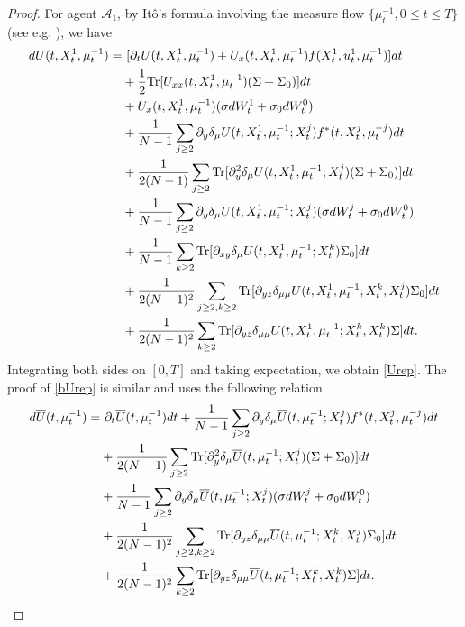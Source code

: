 \documentclass{amsart}
\theoremstyle{definition}
\theoremstyle{remark}
\numberwithin{equation}{section}
\begin{document}
\begin{proof}
For agent ${\mathcal A}_1$, by It\^o's formula involving the measure flow
$\{\mu^{-1}_t, 0\le t\le T\}$ (see e.g. \cite{CDLL19,CD18,C21}),  we have
{\allowdisplaybreaks
\begin{align*}
dU(t, X_t^1, \mu_t^{-1}) =&\ [\partial_t U(t, X^1_t, \mu_t^{-1}) + U_{x}(t, X^1_t, \mu_t^{-1}) f(X_t^1, u^1_t, \mu_t^{-1})] dt \\
& +\frac{1}{2} {\rm Tr}[ U_{xx}(t, X^1_t, \mu_t^{-1}) (\Sigma+\Sigma_0)] dt \\
&  +  U_{x}(t, X^1_t, \mu_t^{-1})(\sigma dW^1_t+ \sigma_0 dW_t^0)  \\
&+ \frac{1}{N-1}\sum_{j\ge 2} \partial_{y}\delta_\mu U(t, X^1_t,\mu_t^{-1}; X^j_t)f^*(t, X_t^j, \mu_t^{-j}) dt \\
& + \frac{1}{2(N-1)}\sum_{j\ge 2 }{\rm Tr}[\partial_{y}^2\delta_\mu U(t, X^1_t,\mu_t^{-1}; X^j_t)(\Sigma+\Sigma_0 )]dt \\
&  + \frac{1}{N-1}\sum_{j\ge 2  } \partial_{y}\delta_\mu U(t, X^1_t,\mu_t^{-1}; X^j_t)(\sigma dW^j_t + \sigma_0 dW_t^0 )   \\
&  + \frac{1}{N-1}\sum_{k\ge 2  }{\rm Tr} [\partial_{xy}\delta_\mu U(t, X^1_t,\mu_t^{-1}; X^k_t)\Sigma_0 ]dt\\
&+   \frac{1}{2(N-1)^2}\sum_{j\ge 2,k\ge 2  } \mbox{Tr}[\partial_{yz}
\delta_{\mu\mu}
U(t, X^1_t,\mu_t^{-1};X_t^k, X^j_t)\Sigma_0 ]dt\\
&+   \frac{1}{2(N-1)^2}\sum_{k\ge 2  }\mbox{Tr}[ \partial_{yz}
\delta_{\mu\mu}
U(t, X^1_t,\mu_t^{-1};X_t^k, X^k_t)\Sigma ]dt.
\end{align*}
}
Integrating  both sides on $[0,T]$ and taking expectation, we obtain \eqref{Urep}. The proof of \eqref{bUrep}  is similar and  uses  the following relation
\begin{align}
d\overline U(t, \mu_t^{-1}) = & \ \partial_t \overline U(t, \mu_t^{-1})dt+\frac{1}{N-1}\sum_{j\ge 2} \partial_{y}\delta_\mu \overline U(t, \mu_t^{-1}; X^j_t)f^*(t, X_t^j, \mu_t^{-j}) dt \\
& + \frac{1}{2(N-1)}\sum_{j\ge 2 }{\rm Tr}[ \partial_{y}^2\delta_\mu \overline U(t, \mu_t^{-1}; X^j_t)(\Sigma+\Sigma_0) ]dt \notag \\
&  + \frac{1}{N-1}\sum_{j\ge 2  } \partial_{y}\delta_\mu
\overline U(t, \mu_t^{-1}; X^j_t) (\sigma dW^j_t  +\sigma_0  dW^0_t  )   \notag \\
&+   \frac{1}{2(N-1)^2}\sum_{j\ge 2,k\ge 2  }\mbox{Tr} [\partial_{yz}
\delta_{\mu\mu}
\overline U(t, \mu_t^{-1};X_t^k, X^j_t)\Sigma_0 ]dt\notag \\
&+   \frac{1}{2(N-1)^2}\sum_{k\ge 2  } \mbox{Tr} [\partial_{yz}
\delta_{\mu\mu}
\overline U(t,\mu_t^{-1};X_t^k, X^k_t)\Sigma]dt.\notag
\end{align}
\end{proof}
\end{document}
